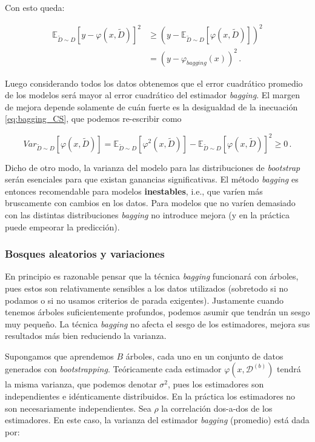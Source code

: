 Con esto queda:

\begin{align}
    \mathbb{E}_{ \tilde D \sim D } \left[ y - \varphi(x,\tilde D) \right]^2 & \geq (y - \mathbb{E}_{ \tilde D \sim D } \left[\varphi(x,\tilde D) \right] )^2
    \\ & = (y - \varphi_{bagging}(x))^2 \,.
\end{align}

Luego considerando todos los datos obtenemos que el error cuadrático promedio de los modelos será mayor al error cuadrático del estimador \textit{bagging}. El margen de mejora depende solamente de cuán fuerte es la desigualdad de la inecuación \ref{eq:bagging_CS}, que podemos re-escribir como

\begin{equation}
    Var_{ \tilde D \sim D } \left[\varphi(x,\tilde D) \right] = \mathbb{E}_{ \tilde D \sim D } \left[\varphi^2(x,\tilde D) \right] - \mathbb{E}_{ \tilde D \sim D } \left[\varphi(x,\tilde D) \right]^2 \geq 0 \,.
\end{equation}

Dicho de otro modo, la varianza del modelo para las distribuciones de \textit{bootstrap} serán esenciales para que existan ganancias significativas. El método \textit{bagging} es entonces recomendable para modelos \textbf{inestables}, i.e., que varíen más bruscamente con cambios en los datos. Para modelos que no varíen demasiado con las distintas distribuciones \textit{bagging} no introduce mejora (y en la práctica puede empeorar la predicción).


\subsubsection{Bosques aleatorios y variaciones}

En principio es razonable pensar que la técnica \textit{bagging} funcionará con árboles, pues estos son relativamente sensibles a los datos utilizados (sobretodo si no podamos o si no usamos criterios de parada exigentes). Justamente cuando tenemos árboles suficientemente profundos, podemos asumir que tendrán un sesgo muy pequeño. La técnica \textit{bagging} no afecta el sesgo de los estimadores, mejora sus resultados más bien reduciendo la varianza.

Supongamos que aprendemos $B$ árboles, cada uno en un conjunto de datos generados con \textit{bootstrapping}. Teóricamente cada estimador $\varphi(x,\mathcal{D}^{(b)})$ tendrá la misma varianza, que podemos denotar $\sigma^2$, pues los estimadores son independientes e idénticamente distribuidos. En la práctica los estimadores no son necesariamente independientes. Sea $\rho$ la correlación dos-a-dos de los estimadores. En este caso, la varianza del estimador \textit{bagging} (promedio) está dada por:


